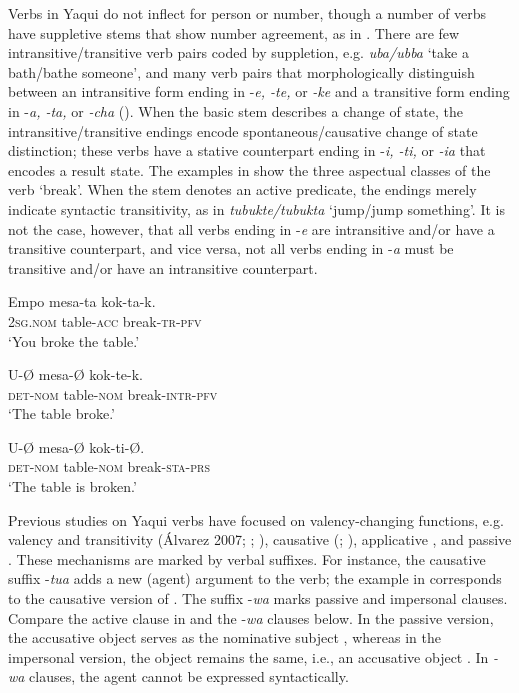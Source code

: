 \documentclass[output=paper]{langscibook}
\begin{document}
Verbs in Yaqui do not inflect for person or number, though a number of verbs have suppletive stems that show number agreement, as in . There are few intransitive/transitive verb pairs coded by suppletion, e.g. \textit{uba/ubba} ‘take a bath/bathe someone’, and many verb pairs that morphologically distinguish between an intransitive form ending in -\textit{e, -te,} or \textit{{}-ke} and a transitive form ending in -\textit{a, -ta,} or \textit{{}-cha} (\citealt{DedrickCasad1999,Guerrero2004}). When the basic stem describes a change of state, the intransitive/transitive endings encode spontaneous/causative change of state distinction; these verbs have a stative counterpart ending in -\textit{i, -ti,} or \textit{{}-ia} that encodes a result state. The examples in  show the three aspectual classes of the verb ‘break’. When the stem denotes an active predicate, the endings merely indicate syntactic transitivity, as in \textit{tubukte/tubukta} ‘jump/jump something’. It is not the case, however, that all verbs ending in -\textit{e} are intransitive and/or have a transitive counterpart, and vice versa, not all verbs ending in -\textit{a} must be transitive and/or have an intransitive counterpart.



\ea%
    \label{ex:guerrero:4}
 \ea
 \label{ex:guerrero:4a}
\gll Empo    mesa-ta  kok-ta-k.\\
  2\textsc{sg}.\textsc{nom}  table-\textsc{acc}  break-\textsc{tr-pfv}\\
\glt ‘You broke the table.’

\ex
\label{ex:guerrero:4b}
\gll U-Ø  mesa-Ø  kok-te-k.\\
  \textsc{det-nom}  table-\textsc{nom}    break-\textsc{intr-pfv}\\
\glt ‘The table broke.’

\ex
\label{ex:guerrero:4c}
\gll U-Ø    mesa-Ø  kok-ti-Ø.\\
  \textsc{det-nom}  table-\textsc{nom}    break-\textsc{sta-prs}\\
\glt ‘The table is broken.’
\z
\z



Previous studies on Yaqui verbs have focused on valency-changing functions, e.g. valency and transitivity (Álvarez 2007; \citealt{EstradaEtAl2015}; \citealt{Tubino2017}), causative (\citealt{Guerrero2008}; \citealt{Tubino2011}), applicative \citep{Guerrero2007}, and passive \citep{Escalante1990}. These mechanisms are marked by verbal suffixes. For instance, the causative suffix -\textit{tua} adds a new (agent) argument to the verb; the example in  corresponds to the causative version of . The suffix -\textit{wa} marks passive and impersonal clauses. Compare the active clause in  and the -\textit{wa} clauses below. In the passive version, the accusative object serves as the nominative subject , whereas in the impersonal version, the object remains the same, i.e., an accusative object . In \textit{{}-wa} clauses, the agent cannot be expressed syntactically.
\end{document}
